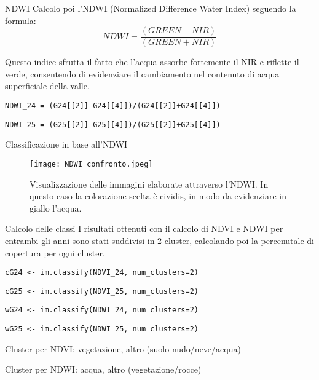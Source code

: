 \documentclass{beamer} %
\begin{document}
\begin{frame}{NDWI}
    Calcolo poi l'NDWI (Normalized Difference Water Index) seguendo la formula:
    \begin{equation}
                NDWI = \frac{(GREEN - NIR)}{(GREEN + NIR)}
    \end{equation}
    
    \bigskip Questo indice sfrutta il fatto che l'acqua assorbe fortemente il NIR e riflette il verde, consentendo di evidenziare il cambiamento nel contenuto di acqua superficiale della valle.

    \begin{center}
        \bigskip \texttt{NDWI\_24 = (G24[[2]]-G24[[4]])/(G24[[2]]+G24[[4]])}
    
        \bigskip\texttt{NDWI\_25 = (G25[[2]]-G25[[4]])/(G25[[2]]+G25[[4]])}
    \end{center}
\end{frame}

\begin{frame}{Classificazione in base all'NDWI}
\begin{figure}
    \centering
    \texttt{[image: NDWI\_confronto.jpeg]}
    \caption{Visualizzazione delle immagini elaborate attraverso l'NDWI. In questo caso la colorazione scelta è cividis, in modo da evidenziare in giallo l'acqua.}
    \label{fig:placeholder}
\end{figure}
    
\end{frame}

\begin{frame}{Calcolo delle classi}
    I risultati ottenuti con il calcolo di NDVI e NDWI per entrambi gli anni sono stati suddivisi in 2 cluster, calcolando poi la percenutale di copertura per ogni cluster.

    \begin{center}
        \bigskip \texttt{cG24 <- im.classify(NDVI\_24, num\_clusters=2)}
    
        \texttt{cG25 <- im.classify(NDVI\_25, num\_clusters=2)}

        \bigskip \texttt{wG24 <- im.classify(NDWI\_24, num\_clusters=2)}

        \texttt{wG25 <- im.classify(NDWI\_25, num\_clusters=2)}
    \end{center}
    
    \bigskip\textnormal{Cluster per NDVI: vegetazione, altro (suolo nudo/neve/acqua)}
    
    \textnormal{Cluster per NDWI: acqua, altro (vegetazione/rocce)}
\end{frame}
\end{document}
